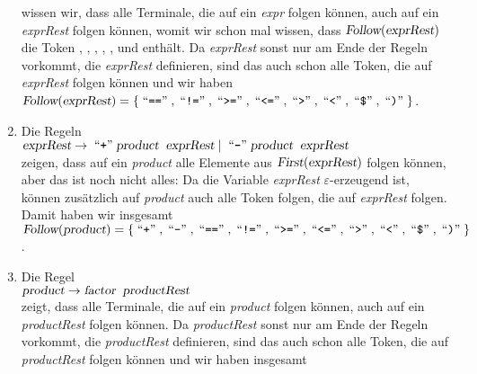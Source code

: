\begin{enumerate}
      wissen wir, dass alle Terminale, die auf ein \textsl{expr} folgen können, auch auf
      ein \textsl{exprRest} folgen können, womit wir schon mal wissen, dass
      $\textsl{Follow}(\textsl{exprRest})$ die Token \qote{==}, \qote{!=}, \qote{<=}, \qote{>=}, \qote{<},   und \qote{)}
      enthält.   Da \textsl{exprRest} sonst nur am Ende der Regeln vorkommt, die
      \textsl{exprRest} definieren, sind das auch schon alle Token, die auf
      \textsl{exprRest} folgen können und wir haben
      \\[0.2cm]
      \hspace*{1.3cm}
      $\textsl{Follow}(\textsl{exprRest}) = 
       \{ \quoted{==}, \quoted{!=}, \quoted{>=}, \quoted{<=}, \quoted{>}, \quoted{<}, \quoted{\symbol{36}}, \quoted{)} \}$.
\item Die Regeln 
      \\[0.2cm]
      \hspace*{1.3cm}
      $\textsl{exprRest} \rightarrow \;\mbox{``\texttt{+}''}\; \textsl{product}\;\;\textsl{exprRest} 
                         \mid        \;\mbox{``\texttt{-}''}\; \textsl{product}\;\;\textsl{exprRest}$
      \\[0.2cm]
      zeigen, dass auf ein \textsl{product} alle Elemente aus $\textsl{First}(\textsl{exprRest})$
      folgen können, aber das ist noch nicht alles:  Da die Variable \textsl{exprRest}
      $\varepsilon$-erzeugend ist, können zusätzlich auf \textsl{product} auch
      alle Token folgen, die auf \textsl{exprRest} folgen.  Damit haben wir insgesamt
      \\[0.2cm]
      \hspace*{1.3cm}
      $\textsl{Follow}(\textsl{product}) = 
      \{ \quoted{+}, \quoted{-},  \quoted{==}, \quoted{!=}, \quoted{>=}, \quoted{<=}, \quoted{>}, \quoted{<}, \quoted{\symbol{36}}, \quoted{)} \}$.
\item Die Regel
      \\[0.2cm]
      \hspace*{1.3cm}
      $\textsl{product} \rightarrow \textsl{factor}\;\;\textsl{productRest}$
      \\[0.2cm]      
      zeigt, dass alle Terminale, die auf ein \textsl{product} folgen können, auch auf
      ein \textsl{productRest} folgen können.
      Da \textsl{productRest} sonst nur am Ende der Regeln vorkommt, die
      \textsl{productRest} definieren, sind das auch schon alle Token, die auf
      \textsl{productRest} folgen können und wir haben insgesamt
      \\[0.2cm]
      \hspace*{1.3cm}

\end{enumerate}
